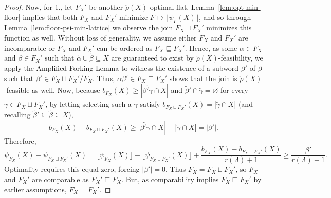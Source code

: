 \documentclass[11pt]{article}
\newcommand{\glang}{\Lambda}
\newcommand{\greedyrep}{\ddot{\rho}}
\begin{document}
\begin{proof}
    Now, for 1., let $F_X'$ be another $\greedyrep(X)$-optimal flat.
    Lemma~\ref{lem:opt-min-floor} implies that both $F_X$ and $F_X'$ minimize $F\mapsto\lfloor\psi_F(X)\rfloor$, and so
    through Lemma~\ref{lem:floor-psi-min-lattice} we observe the join $F_X\sqcup F_X'$ minimizes this function as well.
    Without loss of generality, we assume either $F_X$ and $F_X'$ are incomparable or $F_X$ and $F_X'$ can be ordered as $F_X\sqsubseteq F_X'$.
    Hence, as some $\alpha\in F_X$ and $\beta \in F_X'$ such that $\widetilde{\alpha}\cup\widetilde{\beta}\subseteq X$ are guaranteed to exist by $\greedyrep(X)$-feasibility, we apply the Amplified Forking Lemma to witness the existence of a subword $\beta'$ of $\beta$ such that $\beta'\in F_X\sqcup F_X'/F_X$.
    Thus, $\alpha\beta'\in F_X\sqsubseteq F_X'$ shows that the join is $\greedyrep(X)$-feasible as well.
    Now, because $b_{F_X}(X) \geq |\widetilde{\beta'\gamma}\cap X|$ and $\widetilde{\beta}'\cap\widetilde{\gamma} = \varnothing$ for every $\gamma \in F_X\sqcup F_X'$, by letting selecting such a $\gamma$ satisfy $b_{F_X\sqcup F_X'}(X) =|\widetilde{\gamma}\cap X|$ (and recalling $\widetilde{\beta}'\subseteq\widetilde{\beta}\subseteq X$),
    \begin{equation}\label{eq:57ty}
        b_{F_X}(X) - b_{F_X\sqcup F_X'}(X) \geq |\widetilde{\beta'\gamma}\cap X| - |\widetilde{\gamma}\cap X| = |\beta'|.
    \end{equation}
    Therefore,
    \[
        \psi_{F_X}(X) - \psi_{F_X\sqcup F_X'}(X) = \lfloor\psi_{F_X}(X)\rfloor - \lfloor\psi_{F_X\sqcup F_X'}(X)\rfloor + \frac{b_{F_X}(X) - b_{F_X\sqcup F_X'}(X)}{r(\glang) + 1} \geq \frac{|\beta'|}{r(\glang) + 1}.
    \]
    Optimality requires this equal zero, forcing $|\beta'| = 0$.
    Thus $F_X = F_X\sqcup F_X'$, so $F_X$ and $F_X'$ are comparable as $F_X'\sqsubseteq F_X$.
    But, as comparability implies $F_X\sqsubseteq F_X'$ by earlier assumptions, $F_X = F_X'$.


\end{proof}
\end{document}
